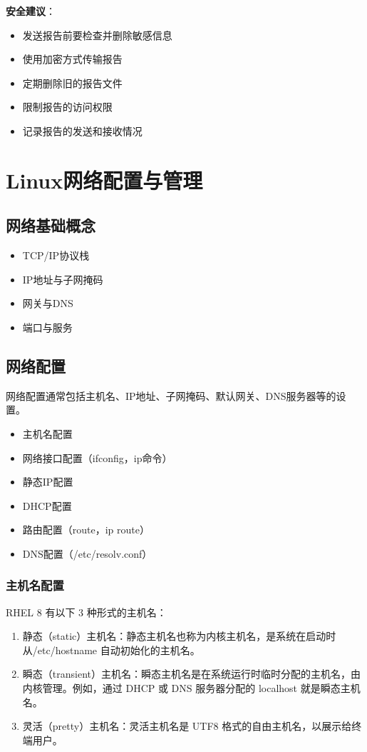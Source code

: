 \documentclass[12pt,UTF8]{ctexbook}
\begin{document}
\textbf{安全建议}：
\begin{itemize}
    \item 发送报告前要检查并删除敏感信息
    \item 使用加密方式传输报告
    \item 定期删除旧的报告文件
    \item 限制报告的访问权限
    \item 记录报告的发送和接收情况
\end{itemize}

\chapter{Linux网络配置与管理}

\section{网络基础概念}
\begin{itemize}
    \item TCP/IP协议栈
    \item IP地址与子网掩码
    \item 网关与DNS
    \item 端口与服务
\end{itemize}

\section{网络配置}
网络配置通常包括主机名、IP地址、子网掩码、默认网关、DNS服务器等的设置。

\begin{itemize}
    \item 主机名配置
    \item 网络接口配置（ifconfig，ip命令）
    \item 静态IP配置
    \item DHCP配置
    \item 路由配置（route，ip route）
    \item DNS配置（/etc/resolv.conf）
\end{itemize}

\subsection{主机名配置}
RHEL 8 有以下 3 种形式的主机名：

\begin{enumerate}
    \item 静态（static）主机名：静态主机名也称为内核主机名，是系统在启动时从/etc/hostname 自动初始化的主机名。
    \item 瞬态（transient）主机名：瞬态主机名是在系统运行时临时分配的主机名，由内核管理。例如，通过 DHCP 或 DNS 服务器分配的 localhost 就是瞬态主机名。
    \item 灵活（pretty）主机名：灵活主机名是 UTF8 格式的自由主机名，以展示给终端用户。
\end{enumerate}
\end{document}
